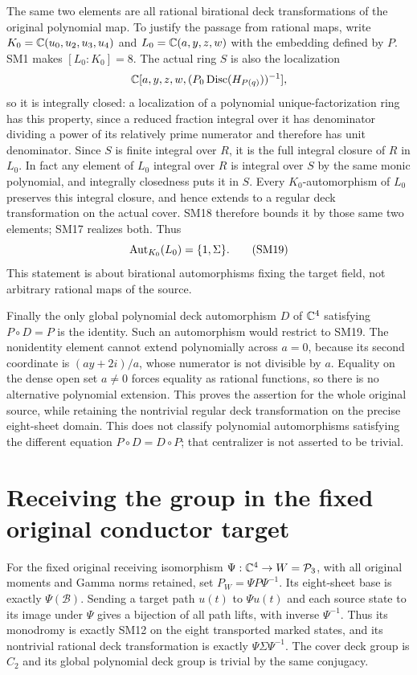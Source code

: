The same two elements are all rational birational deck
transformations of the original polynomial map. To justify the
passage from rational maps, write $K_0=\mathbb C(u_0,u_2,u_3,u_4)$
and $L_0=\mathbb C(a,y,z,w)$ with the embedding defined by $P$.
SM1 makes $[L_0:K_0]=8$. The actual ring $S$ is also the
localization
\[
 \mathbb C[a,y,z,w,(P_0\operatorname{Disc}(H_{P(q)}))^{-1}],
\]
so it is integrally closed: a localization of a polynomial
unique-factorization ring has this property, since a reduced
fraction integral over it has denominator dividing a power of
its relatively prime numerator and therefore has unit denominator.
Since $S$ is finite integral over $R$, it is the full integral
closure of $R$ in $L_0$. In fact any element of $L_0$ integral
over $R$ is integral over $S$ by the same monic polynomial,
and integrally closedness puts it in $S$.
Every $K_0$-automorphism of $L_0$ preserves this integral closure,
and hence extends to a regular deck transformation on the actual
cover. SM18 therefore bounds it by those same two elements;
SM17 realizes both. Thus
\begin{equation}
 \operatorname{Aut}_{K_0}(L_0)=\{1,\Sigma\}.\tag{SM19}
\end{equation}
This statement is about birational automorphisms fixing the
target field, not arbitrary rational maps of the source.

Finally the only global polynomial deck automorphism $D$ of $\mathbb C^4$
satisfying $P\circ D=P$ is the identity. Such an automorphism would
restrict to SM19. The nonidentity element cannot extend
polynomially across $a=0$, because its second coordinate is
$(ay+2i)/a$, whose numerator is not divisible by $a$.
Equality on the dense open set $a\ne0$ forces equality as
rational functions, so there is no alternative polynomial
extension. This proves the assertion for the whole original
source, while retaining the nontrivial regular deck
transformation on the precise eight-sheet domain. This does not
classify polynomial automorphisms satisfying the different equation
$P\circ D=D\circ P$; that centralizer is not asserted to be trivial.

\section{Receiving the group in the fixed original conductor target}
For the fixed original receiving isomorphism
$\Psi:\mathbb C^4\to W=\mathcal P_3$, with all original moments and Gamma
norms retained, set $P_W=\Psi P\Psi^{-1}$. Its eight-sheet
base is exactly $\Psi(\mathcal B)$. Sending a target path
$u(t)$ to $\Psi u(t)$ and each source state to its image under
$\Psi$ gives a bijection of all path lifts, with inverse
$\Psi^{-1}$. Thus its monodromy is exactly SM12 on the eight
transported marked states, and its nontrivial rational deck
transformation is exactly $\Psi\Sigma\Psi^{-1}$. The cover
deck group is $C_2$ and its global polynomial deck group is
trivial by the same conjugacy.

